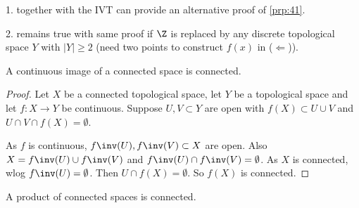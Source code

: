     \begin{remark}
    1.  together with the IVT can provide an alternative proof of \cref{prp:41}.

    2.  remains true with same proof if $\Z$ is replaced by any discrete topological space $Y$ with $|Y| \geq 2$ (need two points to construct $f(x)$ in ($\Longleftarrow$)).
\end{remark}

\begin{proposition} \label{prp:43}
    A continuous image of a connected space is connected.
\end{proposition}

\begin{proof}
    Let $X$ be a connected topological space, let $Y$ be a topological space and let $f:X\to Y$ be continuous. Suppose $U,V\subset Y$ are open with $f(X)\subset U\cup V$ and $U\cap V\cap f(X) = \emptyset$.

    As $f$ is continuous, $f\inv(U),f\inv(V)\subset X$ are open. Also $X = f\inv(U)\cup f\inv(V)$ and $f\inv(U) \cap f\inv(V)=\emptyset$. As $X$ is connected, wlog $f\inv(U)= \emptyset$. Then $U \cap f(X)=\emptyset$. So $f(X)$ is connected.
\end{proof}

\begin{proposition} \label{prp:44}
    A product of connected spaces is connected.
\end{proposition}


